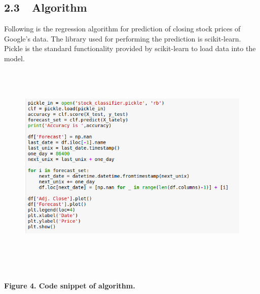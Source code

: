 \documentclass[12pt]{article}
\begin{document}
\subsection*{2.3\ \  \hspace*{10pt}Algorithm}

\vspace{\baselineskip}
Following is the regression algorithm for prediction of closing stock prices of Google’s data. The library used for performing the prediction is scikit-learn. Pickle is the standard functionality provided by scikit-learn to load data into the model.\par




\begin{figure}[H]
	\begin{Center}
		\includegraphics[width=6.27in,height=3.93in]{./media/image6.png}
	\end{Center}
\end{figure}



\begin{Center}
\\
\textbf{Figure 4. Code snippet of algorithm.}
\end{Center}\par
\end{document}
